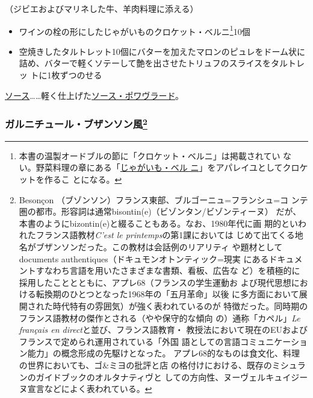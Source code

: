 \begin{recette}


（ジビエおよびマリネした牛、羊肉料理に添える）

\begin{itemize}
\item
  ワインの栓の形にしたじゃがいものクロケット・ベルニ\footnote{本書の温製オードブルの節に「クロケット・ベルニ」は掲載されてい
    ない。野菜料理の章にある「\protect\hyperlink{pommes-de-terre-berny}{じゃがいも・ベル
    ニ}」をアパレイユとしてクロケットを作るこ とになる。}10個
\item
  空焼きしたタルトレット10個にバターを加えたマロンのピュレをドーム状に
  詰め、バターで軽くソテーして艶を出させたトリュフのスライスをタルトレッ
  トに1枚ずつのせる
\end{itemize}

\ul{ソース}\ldots{}\ldots{}軽く仕上げた\protect\hyperlink{sauce-poivrade}{ソース・ポワヴラード}。

\hypertarget{garniture-bezontinne}{%
\subsubsection[ガルニチュール・ブザンソン風]{\texorpdfstring{ガルニチュール・ブザンソン風\footnote{Besonçon
  （ブゾンソン）フランス東部、ブルゴーニュ=フランシュ=コ
  ンテ圏の都市。形容詞は通常bisontin(e)（ビゾンタン/ビゾンティーヌ）
  だが、本書のようにbizontin(e)と綴ることもある。なお、1980年代に画
  期的といわれたフランス語教材\emph{C'est le printemps}の第1課においては
  じめて出てくる地名がブザンソンだった。この教材は会話例のリアリティ
  や題材としてdocuments authentiques（ドキュモンオトンティック=現実
  にあるドキュメントすなわち言語を用いたさまざまな書類、看板、広告な
  ど）を積極的に採用したこととともに、アプレ68（フランスの学生運動お
  よび現代思想における転換期のひとつとなった1968年の「五月革命」以後
  に多方面において展開された時代特有の雰囲気）が強く表われているのが
  特徴だった。同時期のフランス語教材の傑作とされる（やや保守的な傾向
  の）通称「カペル」\emph{Le français en direct}と並び、フランス語教育・
  教授法において現在のEUおよびフランスで定められ運用されている「外国
  語としての言語コミュニケーション能力」の概念形成の先駆けとなった。
  アプレ68的なものは食文化、料理の世界においても、ゴ\&ミヨの批評と店
  の格付けにおける、既存のミシュランのガイドブックのオルタナティヴと
  しての方向性、ヌーヴェルキュイジーヌ宣言などによく表われている。}}{ガルニチュール・ブザンソン風}}\label{garniture-bezontinne}}


\end{recette}
